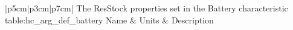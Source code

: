 \begin{customLongTable}{ |p{5cm}|p{3cm}|p{7cm}| }
{The ResStock properties set in the Battery characteristic} {table:hc_arg_def_battery}
{Name & Units & Description}
\end{customLongTable}
